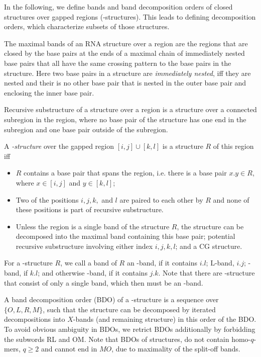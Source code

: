 \documentclass[11pt]{article} %
\newcommand{\Ob}{\text{O}}
\newcommand{\Rb}{\text{R}}
\newcommand{\Lb}{\text{L}}
\newcommand{\Mb}{\text{M}}
\begin{document}
In the following, we define bands and band decomposition orders of closed structures over gapped regions (\CGR-structures). This leads to defining decomposition orders, which characterize subsets of those structures.

The maximal bands of an RNA structure over a region are the regions that are closed by the base pairs at the ends of a maximal chain of immediately nested base pairs that all have the same crossing pattern to the base pairs in the structure. Here two base pairs in a structure are \emph{immediately nested}, iff they are nested and their is no other base pair that is nested in the outer base pair and enclosing the inner base pair.

Recursive substructure of a structure over a region is a structure over a connected subregion in the region, where no base pair of the structure has one end in the subregion and one base pair outside of the subregion.

A \emph{\CGR-structure} over the gapped region $[i,j]\cup[k,l]$ is a structure $R$ of this region iff
\begin{itemize}
  \item $R$ contains a base pair that spans the region, i.e. there is a base pair $x.y\in R$, where $x\in[i,j]$ and $y\in[k,l]$;
  \item Two of the positions $i,j,k,$ and $l$ are paired to each other by $R$ and
    none of these positions is part of recursive substructure.
  \item Unless the region is a single band of the structure $R$, the structure 
    can be decomposed into the maximal band containing this base pair;
    potential recursive substructure involving either index $i,j,k,l$; 
    and a CG structure.
\end{itemize}
For a \CGR-structure $R$, we call a band of $R$ an \Ob-band, if it contains $i.l$; $\Lb$-band, $i.j$; \Rb-band, if $k.l$; and otherwise \Mb-band, if it contains $j.k$. Note that there are \CGR-structure that consist of only a single band, which then must be an \Ob-band.

A band decomposition order (BDO) of a \CGR-structure is a sequence over $\{O,L,R,M\}$, such that the structure can be decomposed by iterated decompositions into $X$-bands (and remaining structure) in this order of the BDO.
To avoid obvious ambiguity in BDOs, we retrict BDOs additionally by forbidding the subwords RL and OM. Note that BDOs of structures, do not contain homo-$q$-mers, $q\geq 2$ and cannot end in $MO$, due to maximality of the split-off bands. 
\end{document}
